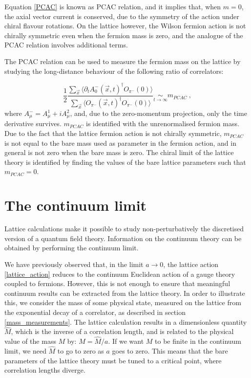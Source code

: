 Equation \ref{PCAC} is known as PCAC relation, and it implies that, when $m=0$, the axial vector current is conserved, due to the symmetry of the action under chiral flavour rotations. On the lattice however, the Wilson fermion action is not chirally symmetric even when the fermion mass is zero, and the analogue of the PCAC relation involves additional terms.  

The PCAC relation can be used to measure the fermion mass on the lattice by studying the long-distance behaviour of the following ratio of correlators:

\begin{equation}
\frac{1}{2} \frac{\sum_{\vec x} \langle \partial_t A^-_{0}(\vec x,t)^{\dagger} O_{\pi^-}(0) \rangle}{\sum_{\vec x} \langle O_{\pi^-}(\vec x,t)^{\dagger} O_{\pi^-}(0) \rangle} \underset{t \to \infty}{\sim} m_{PCAC} \: ,
\end{equation}
%
where $A^-_{\mu} = A^1_{\mu} + iA^2_{\mu}$, and, due to the zero-momentum projection, only the time derivative survives. $m_{PCAC}$ is identified with the unrenormalised fermion mass. Due to the fact that the lattice fermion action is not chirally symmetric, $m_{PCAC}$ is not equal to the bare mass used as parameter in the fermion action, and in general is not zero when the bare mass is zero. The chiral limit of the lattice theory is identified by finding the values of the bare lattice parameters such that $m_{PCAC} = 0$.


\section{The continuum limit}

Lattice calculations make it possible to study non-perturbatively the discretised version of a quantum field theory. Information on the continuum theory can be obtained by performing the continuum limit.

We have previously observed that, in the limit $a \to 0$, the lattice action \ref{lattice_action} reduces to the continuum Euclidean action of a gauge theory coupled to fermions. However, this is not enough to ensure that meaningful continuum results can be extracted from the lattice theory.
In order to illustrate this, we consider the mass of some physical state, measured on the lattice from the exponential decay of a correlator, as described in section \ref{mass_measurements}. The lattice calculation results in a dimensionless quantity $\hat M$, which is the inverse of a correlation length, and is related to the physical value of the mass $M$ by: $M = \hat M/a$. If we want $M$ to be finite in the continuum limit, we need $\hat M$ to go to zero as $a$ goes to zero. This means that the bare parameters of the lattice theory must be tuned to a critical point, where correlation lengths diverge.

